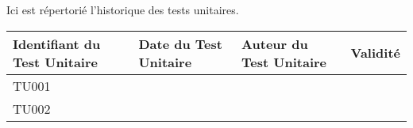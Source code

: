 
Ici est répertorié l'historique des tests unitaires. \\

\begin{table}[H]
\centering
	\begin{tabularx}{17.4cm}{|X|X|X|X|}
	\hline
	\rowcolor{gray!40} Identifiant du Test Unitaire & Date du Test Unitaire & Auteur du Test Unitaire & Validité\\
	\hline
	 TU001 & & & \\
	\hline
	 TU002 & & & \\
	 \hline
	\end{tabularx}
\end{table}

